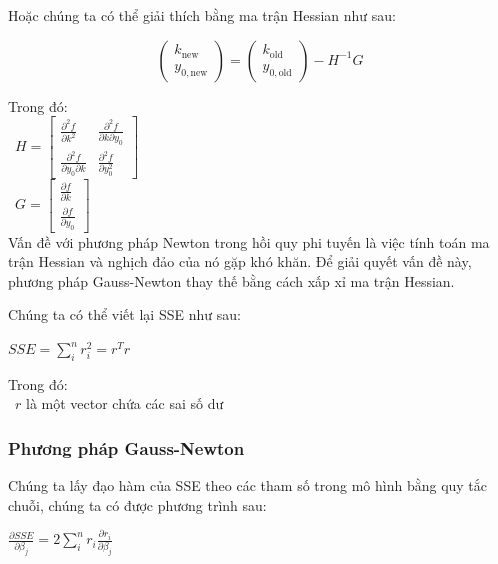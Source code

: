 \documentclass[conference]{IEEEtran}
\begin{document}
Hoặc chúng ta có thể giải thích bằng ma trận Hessian như sau:

\begin{center}
    \[
        \begin{pmatrix}
            k_{\text{new}} \\ y_{0,\text{new}}
        \end{pmatrix} =
        \begin{pmatrix}
            k_{\text{old}} \\ y_{0,\text{old}}
        \end{pmatrix} - H^{-1}G
    \]
\end{center}

Trong đó: \\
\indent\textbullet\ \(H = \begin{bmatrix}
    \frac{\partial^2 f}{\partial k^2}            & \frac{\partial^2 f}{\partial k \partial y_0} \\
    \frac{\partial^2 f}{\partial y_0 \partial k} & \frac{\partial^2 f}{\partial y_0^2}
\end{bmatrix}\)\\
\indent\textbullet\ \(G = \begin{bmatrix}
    \frac{\partial f}{\partial k} \\ \frac{\partial f}{\partial y_0}
\end{bmatrix}\)\\

Vấn đề với phương pháp Newton trong hồi quy phi tuyến là việc tính toán ma trận Hessian và nghịch đảo của nó gặp khó khăn. Để giải quyết vấn đề này, phương pháp Gauss-Newton thay thế bằng cách xấp xỉ ma trận Hessian.

Chúng ta có thể viết lại SSE như sau:
\begin{center}
    $SSE = \sum_{i}^{n}r_i^2 = r^T r$
\end{center}

Trong đó: \\
\indent\textbullet\ \(r\) là một vector chứa các sai số dư \\

\subsubsection{Phương pháp Gauss-Newton}
Chúng ta lấy đạo hàm của SSE theo các tham số trong mô hình bằng quy tắc chuỗi, chúng ta có được phương trình sau:
\begin{center}
    \(
    \frac{\partial SSE}{\partial \beta_j} = 2\sum_{i}^{n} r_i \frac{\partial r_i}{\partial \beta_j}
    \)
\end{center}
\end{document}

